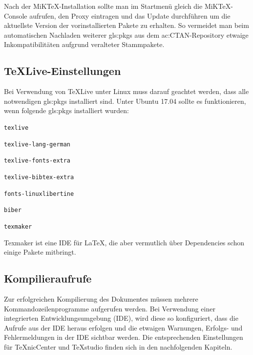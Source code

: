 Nach der MiKTeX-Installation sollte man im Startmenü gleich die MiKTeX-Console aufrufen, den Proxy eintragen und das Update durchführen um die aktuellste Version der vorinstallierten Pakete zu erhalten.
So vermeidet man beim automatischen Nachladen weiterer \glspl{gls:pkg} aus dem \acrshort{ac:CTAN}-Repository etwaige Inkompatibilitäten aufgrund veralteter Stammpakete.


\subsection{TeXLive-Einstellungen}
\label{sec:TeXLive}
Bei Verwendung von TeXLive unter Linux muss darauf geachtet werden, dass alle notwendigen \glspl{gls:pkg} installiert sind.
Unter Ubuntu 17.04 sollte es funktionieren, wenn folgende \glspl{gls:pkg} installiert wurden:
\begin{itemize*}
	\item {\small\verb#texlive#}
	\item {\small\verb#texlive-lang-german#}
	\item {\small\verb#texlive-fonts-extra#}
	\item {\small\verb#texlive-bibtex-extra#}
	\item {\small\verb#fonts-linuxlibertine#}
	\item {\small\verb#biber#}
	\item {\small\verb#texmaker#}
\end{itemize*}
Texmaker ist eine IDE für \LaTeX, die aber vermutlich über Dependencies schon einige Pakete mitbringt.


\subsection{Kompilieraufrufe}
\label{sec:Aufruf}
Zur erfolgreichen Kompilierung des Dokumentes müssen mehrere
Kommandozeilenprogramme aufgerufen werden.
Bei Verwendung einer integrierten Entwicklungsumgebung (IDE),
wird diese so konfiguriert, dass die Aufrufe aus der IDE heraus erfolgen und
die etwaigen Warnungen, Erfolgs- und Fehlermeldungen in der IDE sichtbar werden.
Die entsprechenden Einstellungen für TeXnicCenter und TeXstudio finden sich
in den nachfolgenden Kapiteln.


